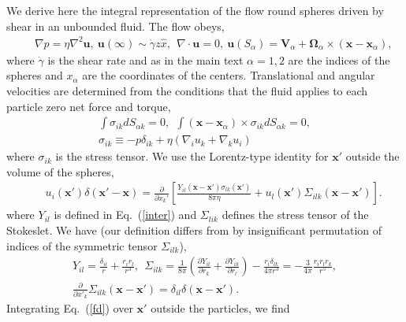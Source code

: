 We derive here the integral representation of the flow round spheres driven by shear in an unbounded fluid. The flow obeys,
\begin{eqnarray}&&\!\!\!\!\!\!\!\!\!\!\!\!\!
\nabla p\!=\!\eta \nabla^2 \bm u,\  \bm u(\infty)\sim \dot{\gamma} z{\hat x},\ \ \nabla\cdot\bm u=0,\ 
\bm u(S_{\alpha})=\bm V_{\alpha}+\bm \Omega_{\alpha}\times (\bm x-\bm x_{\alpha}),
\label{rescaled}
\end{eqnarray}
where $\dot{\gamma}$ is the shear rate and as in the main text $\alpha=1, 2$ are the indices of the spheres and $x_{\alpha}$ are the coordinates of the centers. Translational and angular velocities are determined from the conditions that the fluid applies to each particle zero net force and torque,
\begin{equation} \begin{aligned}  %
\int \sigma_{ik}dS_{\alpha k}=0,\ \ \int (\bm x-\bm x_{\alpha})\times \sigma_{ik}dS_{\alpha k}=0,\\ \sigma_{ik}\equiv -p\delta_{ik}+\eta(\nabla_iu_k+\nabla_ku_i)
\end{aligned}  \end{equation}
where $\sigma_{ik}$ is the stress tensor. We use the Lorentz-type identity for $\bm x'$ outside the volume of the spheres,
\begin{eqnarray}&&
 u_{i}(\bm x')\delta(\bm x'-\bm x)=\frac{\partial}{\partial x_k'}\left[\frac{Y_{il}(\bm x-\bm x')\sigma_{lk}(\bm x')}{8\pi \eta}+u_l(\bm x')\Sigma_{ilk}(\bm x- \bm x')\right].\label{fd}
\end{eqnarray}
where $Y_{il}$ is defined in Eq.~(\ref{inter}) and $\Sigma_{lik}$ defines the stress tensor of the Stokeslet. We have (our definition differs from \cite{kim_karrila} by insignificant permutation of indices of the symmetric tensor $\Sigma_{ilk}$),
\begin{equation} \begin{aligned}   %
Y_{il}=\frac{\delta_{il}}{r}+\frac{r_ir_l}{r^3},\ \ \Sigma_{ilk}=\frac{1}{8\pi}\left(\frac{\partial Y_{il}}{\partial r_k}+\frac{\partial Y_{ik}}{\partial r_l}\right)-\frac{r_i\delta_{lk}}{4\pi r^3}=-\frac{3}{4\pi}\frac{r_ir_lr_k}{r^5},\\
\frac{\partial}{\partial x'_k}\Sigma_{ilk}(\bm x- \bm x')=\delta_{il}\delta(\bm x-\bm x'). \label{free}
\end{aligned} \end{equation}
Integrating Eq.~(\ref{fd}) over $\bm x'$ outside the particles, we find
